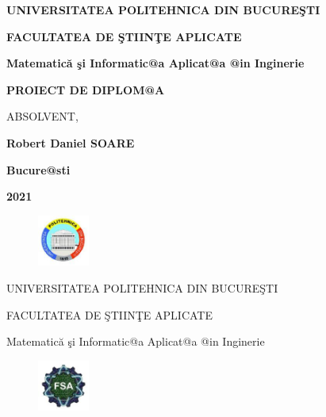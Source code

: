 \documentclass[11pt,twoside]{book}
\begin{document}
\thispagestyle{empty}

\centerline{\bf UNIVERSITATEA POLITEHNICA DIN BUCURE\c STI}

\vspace{0.5cm}

\centerline{\bf FACULTATEA DE \c STIIN\c TE APLICATE}

\vspace{0.5cm}

\centerline{\bf Matematic\u a \c si Informatic@a Aplicat@a @in
Inginerie}

\vspace{5cm}

\centerline{\Huge\bf PROIECT DE DIPLOM@A}

\vspace{6cm}

 \hfill {ABSOLVENT,}

 \hfill{\bf Robert Daniel SOARE}


\vspace{3cm}

\centerline{\bf Bucure@sti}

\vspace{0.5cm}

\centerline{\bf 2021}
\newpage
\thispagestyle{empty}

\newpage
\thispagestyle{empty}

\begin{figure}
\vspace{-3.4cm}
\begin{center}
 \includegraphics[width=0.15\textwidth]{sigla-Poli.eps}
\end{center}
\end{figure}

\newpage
\thispagestyle{empty}

\centerline{UNIVERSITATEA POLITEHNICA DIN BUCURE\c STI}

\centerline{FACULTATEA DE \c STIIN\c TE APLICATE}

\centerline{Matematic\u a \c si Informatic@a Aplicat@a @in
Inginerie}

\begin{figure}
\vspace{-4.7cm}
\begin{center}
  \includegraphics[width=0.15\textwidth]{sigla-Poli-FSA.eps}
\end{center}
\end{figure}
\end{document}
